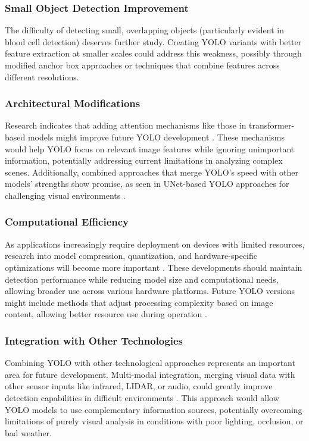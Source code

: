 \subsubsection{Small Object Detection Improvement}
The difficulty of detecting small, overlapping objects (particularly evident in blood cell detection) deserves further study. Creating YOLO variants with better feature extraction at smaller scales could address this weakness, possibly through modified anchor box approaches or techniques that combine features across different resolutions.

\subsubsection{Architectural Modifications}
Research indicates that adding attention mechanisms like those in transformer-based models might improve future YOLO development \citep{Gunawan2024}. These mechanisms would help YOLO focus on relevant image features while ignoring unimportant information, potentially addressing current limitations in analyzing complex scenes. Additionally, combined approaches that merge YOLO's speed with other models' strengths show promise, as seen in UNet-based YOLO approaches for challenging visual environments \citep{Zukal2024}.

\subsubsection{Computational Efficiency}
As applications increasingly require deployment on devices with limited resources, research into model compression, quantization, and hardware-specific optimizations will become more important \citep{Espinoza2023}. These developments should maintain detection performance while reducing model size and computational needs, allowing broader use across various hardware platforms. Future YOLO versions might include methods that adjust processing complexity based on image content, allowing better resource use during operation \citep{Kumar2024}.

\subsubsection{Integration with Other Technologies}
Combining YOLO with other technological approaches represents an important area for future development. Multi-modal integration, merging visual data with other sensor inputs like infrared, LIDAR, or audio, could greatly improve detection capabilities in difficult environments \citep{Espinoza2023}. This approach would allow YOLO models to use complementary information sources, potentially overcoming limitations of purely visual analysis in conditions with poor lighting, occlusion, or bad weather.

